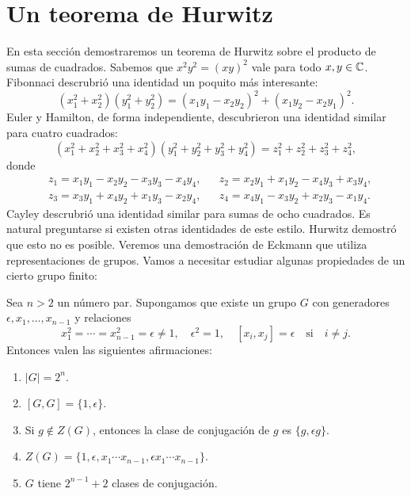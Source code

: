 \chapter{Un teorema de Hurwitz}
\label{Hurwitz}

En esta sección demostraremos un teorema de Hurwitz sobre el producto de sumas
de cuadrados. Sabemos que $x^2y^2=(xy)^2$ vale para todo $x,y\in\mathbb{C}$. Fibonnaci
descrubrió una identidad un poquito más interesante:
\[
	(x_1^2+x_2^2)(y_1^2+y_2^2)=(x_1y_1-x_2y_2)^2+(x_1y_2-x_2y_1)^2.
\]
Euler y Hamilton, de forma independiente, descubrieron una identidad similar
para cuatro cuadrados:
\[
	(x_1^2+x_2^2+x_3^2+x_4^2)(y_1^2+y_2^2+y_3^2+y_4^2)=z_1^2+z_2^2+z_3^2+z_4^2,
\]
donde
\begin{equation}
\label{eq:Hamilton}
\begin{aligned}
	& z_1=x_1y_1-x_2y_2-x_3y_3-x_4y_4, && 
	z_2=x_2y_1+x_1y_2-x_4y_3+x_3y_4,\\
	&z_3=x_3y_1+x_4y_2+x_1y_3-x_2y_4, && 
	z_4=x_4y_1-x_3y_2+x_2y_3-x_1y_4.
\end{aligned}
\end{equation}
Cayley descrubrió una identidad similar para sumas de ocho cuadrados. Es
natural preguntarse si existen otras identidades de este estilo. Hurwitz
demostró que esto no es posible. Veremos una demostración de Eckmann que
utiliza representaciones de grupos.  Vamos a necesitar estudiar algunas
propiedades de un cierto grupo finito:

\begin{lemma}
	Sea $n>2$ un número par. Supongamos que existe un grupo $G$ con generadores
	$\epsilon,x_1,\dots,x_{n-1}$ y relaciones
	\[
		x_1^2=\cdots=x_{n-1}^2=\epsilon\ne1,\quad
		\epsilon^2=1,\quad
		[x_i,x_j]=\epsilon\quad\text{si}\quad i\ne j.
	\]
	Entonces valen las siguientes afirmaciones:
	\begin{enumerate}
		\item $|G|=2^n$.
		\item $[G,G]=\{1,\epsilon\}$.
		\item Si $g\not\in Z(G)$, entonces la clase de conjugación de $g$ es $\{g,\epsilon g\}$.
		\item $Z(G)=\{1,\epsilon,x_1\cdots x_{n-1},\epsilon x_1\cdots x_{n-1}\}$. 
		\item $G$ tiene $2^{n-1}+2$ clases de conjugación.
	\end{enumerate}
\end{lemma}

